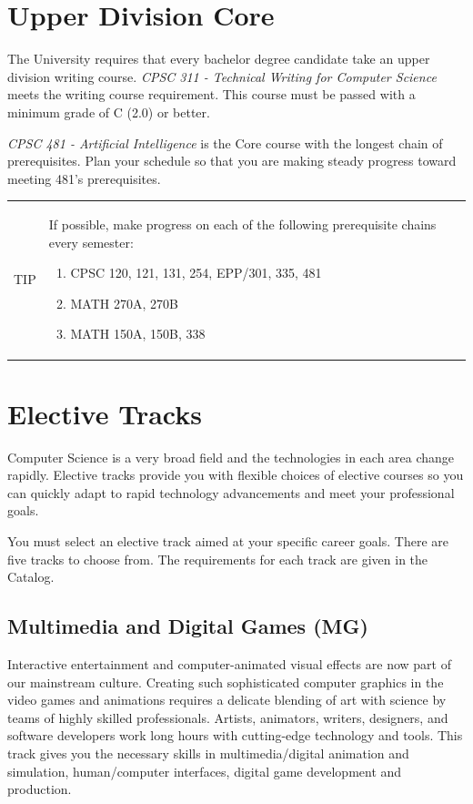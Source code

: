 \documentclass{book}
\newenvironment{tip}{
  \tcolorbox \begin{tabular}{m{.5in} m{5in}} \Large{TIP} &
}{
  \end{tabular} \endtcolorbox
}
\newcommand{\MgTrackName}{Multimedia and Digital Games (MG)}
\begin{document}
\section{Upper Division Core}

The University requires that every bachelor degree candidate take an upper division writing course. \emph{CPSC 311 - Technical Writing for Computer Science} meets the writing course requirement. This course must be passed with a minimum grade of C (2.0) or better.

\emph{CPSC 481 - Artificial Intelligence} is the Core course with the longest chain of prerequisites. Plan your schedule so that you are making steady progress toward meeting 481's prerequisites.

\begin{tip}
  If possible, make progress on each of the following prerequisite chains every semester:
  \begin{enumerate}
  \item CPSC 120, 121, 131, 254, EPP/301, 335, 481
  \item MATH 270A, 270B
  \item MATH 150A, 150B, 338
  \end{enumerate}
\end{tip}

\section{Elective Tracks}
 
Computer Science is a very broad field and the technologies in each area change rapidly. Elective tracks provide you with flexible choices of elective courses so you can quickly adapt to rapid technology advancements and meet your professional goals.

You must select an elective track aimed at your specific career goals. There are five tracks to choose from. The requirements for each track are given in the Catalog.

\subsection{\MgTrackName}
\MgTrackIndex
Interactive entertainment and computer-animated visual effects are now part of our mainstream culture. Creating such sophisticated computer graphics in the video games and animations requires a delicate blending of art with science by teams of highly skilled professionals. Artists, animators, writers, designers, and software developers work long hours with cutting-edge technology and tools. This track gives you the necessary skills in multimedia/digital animation and simulation, human/computer interfaces, digital game development and production.
\end{document}
